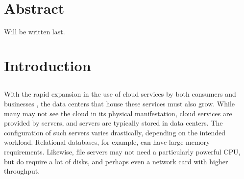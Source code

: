 \documentclass[11pt]{article}
\begin{document}
\newpage

\tableofcontents
\newpage
\listoffigures
\listoftables
\newpage


\section*{Abstract}
Will be written last.
\newpage

\section{Introduction} \label{sec:introduction}
	\subsection{\opendc{}}
		With the rapid expansion in the use of cloud services by both consumers and businesses \cite{Kushida2015}\cite{mokhtar2013}, the data centers that house these services must also grow. 
		While many may not see the cloud in its physical manifestation, cloud services are provided by servers, and servers are typically stored in data centers. 
		The configuration of such servers varies drastically, depending on the intended workload. 
		Relational databases, for example, can have large memory requirements. 
		Likewise, file servers may not need a particularly powerful CPU, but do require a lot of disks, and perhaps even a network card with higher throughput.
\end{document}
